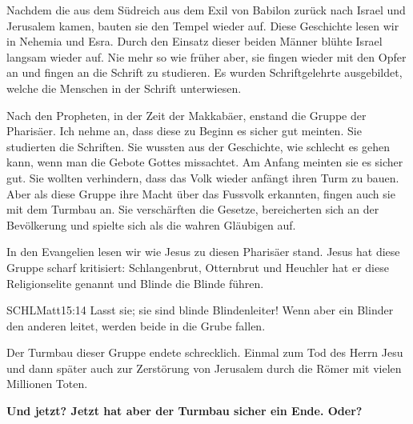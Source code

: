 \documentclass[14pt]{../../inc/mybib}
\newenvironment{block}[1][]{%
  \vspace{1.5em}%
  \noindent\textbf{#1}\par%
  \vspace{0.0em}%
}{%
  \vspace{1em}%
}
\begin{document}
\begin{block}
    Nachdem die aus dem Südreich aus dem Exil von Babilon zurück nach Israel und Jerusalem kamen, bauten sie den Tempel wieder auf. Diese Geschichte lesen wir in Nehemia und Esra. Durch den Einsatz dieser beiden Männer blühte Israel langsam wieder auf. Nie mehr so wie früher aber, sie fingen wieder mit den Opfer an und fingen an die Schrift zu studieren. Es wurden Schriftgelehrte ausgebildet, welche die Menschen in der Schrift unterwiesen. 
    
    Nach den Propheten, in der Zeit der Makkabäer, enstand die Gruppe der Pharisäer. Ich nehme an, dass diese zu Beginn es sicher gut meinten. Sie studierten die Schriften. Sie wussten aus der Geschichte, wie schlecht es gehen kann, wenn man die Gebote Gottes missachtet. Am Anfang meinten sie es sicher gut. Sie wollten verhindern, dass das Volk wieder anfängt ihren Turm zu bauen. Aber als diese Gruppe ihre Macht über das Fussvolk erkannten, fingen auch sie mit dem Turmbau an. Sie verschärften die Gesetze, bereicherten sich an der Bevölkerung und spielte sich als die wahren Gläubigen auf.
    
    In den Evangelien lesen wir wie Jesus zu diesen Pharisäer stand. Jesus hat diese Gruppe scharf kritisiert:  Schlangenbrut, Otternbrut und Heuchler hat er diese Religionselite genannt und Blinde die Blinde führen.
    \begin{bibelbox}{SCHL}{Matt}{15:14}
        Lasst sie; sie sind blinde Blindenleiter! Wenn aber ein Blinder den anderen leitet, werden beide in die Grube fallen.
    \end{bibelbox} 
    Der Turmbau dieser Gruppe endete schrecklich. Einmal zum Tod des Herrn Jesu und dann später auch zur Zerstörung von Jerusalem durch die Römer mit vielen Millionen Toten. 
    
    \textbf{Und jetzt? Jetzt hat aber der Turmbau sicher ein Ende. Oder?}
\end{block}
\end{document}
